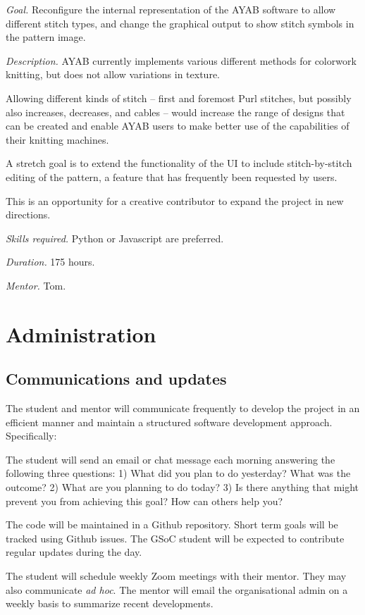 \documentclass{article}
\begin{document}
\textit{Goal.} Reconfigure the internal representation of the AYAB software to allow different stitch types, and change the graphical output to show stitch symbols in the pattern image.

\textit{Description.} AYAB currently implements various different methods for colorwork knitting, but does not allow variations in texture. 

Allowing different kinds of stitch -- first and foremost Purl stitches, but possibly also increases, decreases, and cables -- would increase the range of designs that can be created and enable AYAB users to make better use of the capabilities of their knitting machines.

A stretch goal is to extend the functionality of the UI to include stitch-by-stitch editing of the pattern, a feature that has frequently been requested by users.

This is an opportunity for a creative contributor to expand the project in new directions.

\textit{Skills required.} Python or Javascript are preferred.

\textit{Duration.} 175 hours. 

\textit{Mentor.} Tom.


\section{Administration}

\subsection{Communications and updates}

The student and mentor will communicate frequently to develop the project in an efficient manner and
maintain a structured software development approach. Specifically:

The student will send an email or chat message each morning answering the following three questions:
1) What did you plan to do yesterday? What was the outcome?
2) What are you planning to do today?
3) Is there anything that might prevent you from achieving this goal? How can others help
you?

The code will be maintained in a Github repository. Short term goals will be tracked using Github issues. The GSoC student will be expected to contribute regular updates during the day.

The student will schedule weekly Zoom meetings with their mentor. They may also communicate \textit{ad hoc}. The mentor will email the organisational admin on a weekly basis to summarize recent developments.
\end{document}
